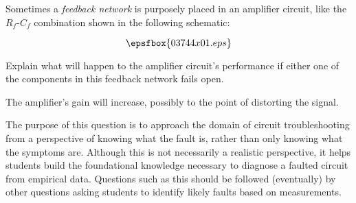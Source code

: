 

Sometimes a {\it feedback network} is purposely placed in an amplifier circuit, like the $R_f$-$C_f$ combination shown in the following schematic:

$$\epsfbox{03744x01.eps}$$

Explain what will happen to the amplifier circuit's performance if either one of the components in this feedback network fails open.







The amplifier's gain will increase, possibly to the point of distorting the signal.







The purpose of this question is to approach the domain of circuit troubleshooting from a perspective of knowing what the fault is, rather than only knowing what the symptoms are.  Although this is not necessarily a realistic perspective, it helps students build the foundational knowledge necessary to diagnose a faulted circuit from empirical data.  Questions such as this should be followed (eventually) by other questions asking students to identify likely faults based on measurements.




